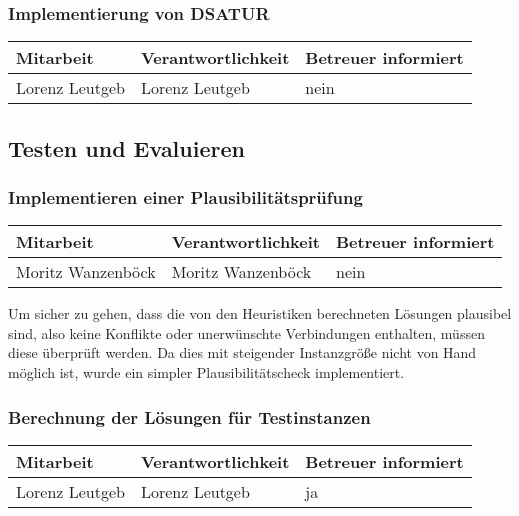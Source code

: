 \subsubsection{ Implementierung von DSATUR}

\begin{center}
\begin{tabular}{lll}
	Mitarbeit & Verantwortlichkeit & Betreuer informiert \\
	\hline
	Lorenz Leutgeb & Lorenz Leutgeb & nein \\
\end{tabular}
\end{center}

\subsection{Testen und Evaluieren}

\subsubsection{ Implementieren einer Plausibilitätsprüfung}

\begin{center}
\begin{tabular}{lll}
	Mitarbeit & Verantwortlichkeit & Betreuer informiert \\
	\hline
	Moritz Wanzenböck & Moritz Wanzenböck & nein \\
\end{tabular}
\end{center}

Um sicher zu gehen, dass die von den Heuristiken berechneten Lösungen plausibel sind, also keine Konflikte oder unerwünschte Verbindungen enthalten, müssen diese überprüft werden. Da dies mit steigender Instanzgröße nicht von Hand möglich ist, wurde ein simpler Plau\-si\-bi\-li\-täts\-check implementiert.

\subsubsection{ Berechnung der Lösungen für Testinstanzen}

\begin{center}
\begin{tabular}{lll}
	Mitarbeit & Verantwortlichkeit & Betreuer informiert \\
	\hline
	Lorenz Leutgeb & Lorenz Leutgeb & ja \\
\end{tabular}
\end{center}

